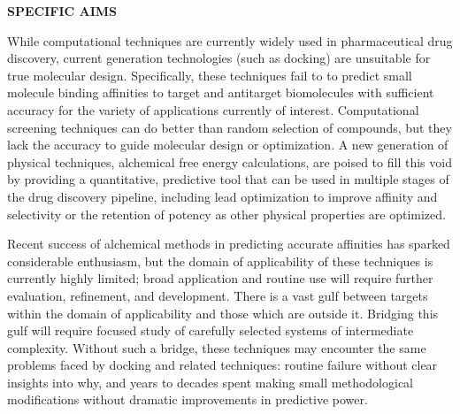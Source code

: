 \documentclass[11pt]{article}
\begin{document}





\noindent \begin{center}
{\bf SPECIFIC AIMS}
\end{center}

While computational techniques are currently widely used in pharmaceutical drug discovery, current generation technologies (such as docking) are unsuitable for true molecular design. 
Specifically, these techniques fail to to predict small molecule binding affinities to target and antitarget biomolecules with sufficient accuracy for the variety of applications currently of interest. 
Computational screening techniques can do better than random selection of compounds, but they lack the accuracy to guide molecular design or optimization. 
A new generation of physical techniques, alchemical free energy calculations, are poised to fill this void by providing a quantitative, predictive tool that can be used in multiple stages of the drug discovery pipeline, including lead optimization to improve affinity and selectivity or the retention of potency as other physical properties are optimized. 

Recent success of alchemical methods in predicting accurate affinities has sparked considerable enthusiasm, but the domain of applicability of these techniques is currently highly limited; broad application and routine use will require further evaluation, refinement, and development. 
There is a vast gulf between targets within the domain of applicability and those which are outside it. 
Bridging this gulf will require focused study of carefully selected systems of intermediate complexity. 
Without such a bridge, these techniques may encounter the same problems faced by docking and related techniques: routine failure without clear insights into why, and years to decades spent making small methodological modifications without dramatic improvements in predictive power.
\end{document}
